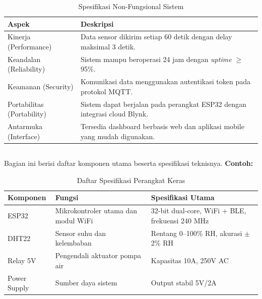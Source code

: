 \documentclass{elsinta}
\begin{document}
\begin{table}[h!]
\centering
\caption{Spesifikasi Non-Fungsional Sistem}
\renewcommand{\arraystretch}{1.2}
\begin{tabular}{p{} p{}}
    \hline
    \textbf{Aspek} & \textbf{Deskripsi} \\
    \hline
    Kinerja (Performance) & Data sensor dikirim setiap 60 detik dengan delay maksimal 3 detik. \\
    Keandalan (Reliability) & Sistem mampu beroperasi 24 jam dengan \textit{uptime} $\geq$ 95\%. \\
    Keamanan (Security) & Komunikasi data menggunakan autentikasi token pada protokol MQTT. \\
    Portabilitas (Portability) & Sistem dapat berjalan pada perangkat ESP32 dengan integrasi cloud Blynk. \\
    Antarmuka (Interface) & Tersedia dashboard berbasis web dan aplikasi mobile yang mudah digunakan. \\
    \hline
\end{tabular}
\end{table}

\subsection{\HardwareSpecTitle}
Bagian ini berisi daftar komponen utama beserta spesifikasi teknisnya. \textbf{Contoh:}

\begin{table}[h!]
\centering
\caption{Daftar Spesifikasi Perangkat Keras}
\renewcommand{\arraystretch}{1.2}
\begin{tabular}{p{} p{} p{}}
    \hline
    \textbf{Komponen} & \textbf{Fungsi} & \textbf{Spesifikasi Utama} \\
    \hline
    ESP32 & Mikrokontroler utama dan modul WiFi & 32-bit dual-core, WiFi + BLE, frekuensi 240 MHz \\
    DHT22 & Sensor suhu dan kelembaban & Rentang 0--100\% RH, akurasi $\pm$2\% RH \\
    Relay 5V & Pengendali aktuator pompa air & Kapasitas 10A, 250V AC \\
    Power Supply & Sumber daya sistem & Output stabil 5V/2A \\
    \hline
\end{tabular}
\end{table}
\end{document}
